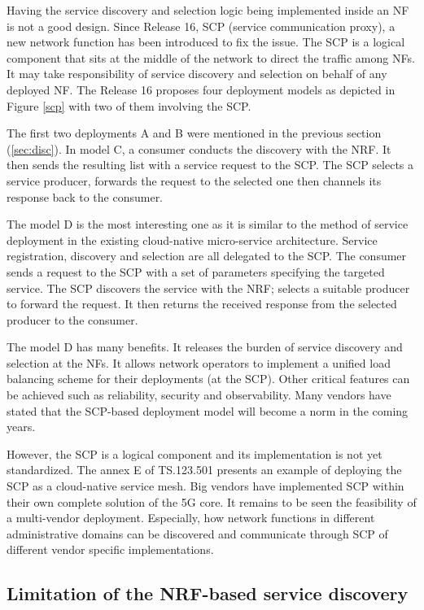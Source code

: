 \documentclass[conference]{IEEEtran}
\begin{document}
Having the service discovery and selection logic being implemented inside an NF
is not a good design. Since Release 16\cite{rel16}, SCP (service communication
proxy), a new network function has been introduced to fix the issue.  The SCP
is a logical component that sits at the middle of the network to direct the
traffic among NFs. It may take responsibility of service discovery and
selection on behalf of any deployed NF. The Release 16 proposes four deployment
models as depicted in Figure \ref{scp} with two of them involving the SCP.

The first two deployments A and B were mentioned in the previous section
(\ref{sec:disc}). In model C, a consumer conducts the discovery with the NRF.
It then sends the resulting list with  a service request to the SCP. The SCP
selects a service producer, forwards the request to the selected one then
channels its response back to the consumer. 

The model D is the most interesting one as it is similar to the method of
service deployment in the existing cloud-native micro-service architecture.
Service registration, discovery and selection are all delegated to the SCP.
The consumer sends a request to the SCP with a set of parameters specifying the
targeted service. The SCP discovers the service with the NRF; selects a
suitable producer to forward the request. It then returns the received
response from the selected producer to the consumer.

The model D has many benefits. It releases the burden of service discovery and
selection at the NFs. It allows network operators to implement a unified load
balancing scheme for their deployments (at the SCP).  Other critical
features can be achieved such as reliability, security and observability. Many
vendors have stated that the SCP-based deployment model will become a norm in the
coming years\cite{huawei}\cite{oracle}.

However, the SCP is a logical component and its implementation is not yet
standardized. The annex E of TS.123.501\cite{rel16} presents an example of
deploying the SCP as a cloud-native service mesh. Big vendors have implemented
SCP within their own complete solution of the 5G core. It remains to be seen
the feasibility of a multi-vendor deployment. Especially, how network functions
in different administrative domains can be discovered and communicate through
SCP of different vendor specific implementations.

\subsection{Limitation of the NRF-based service discovery}
\end{document}
